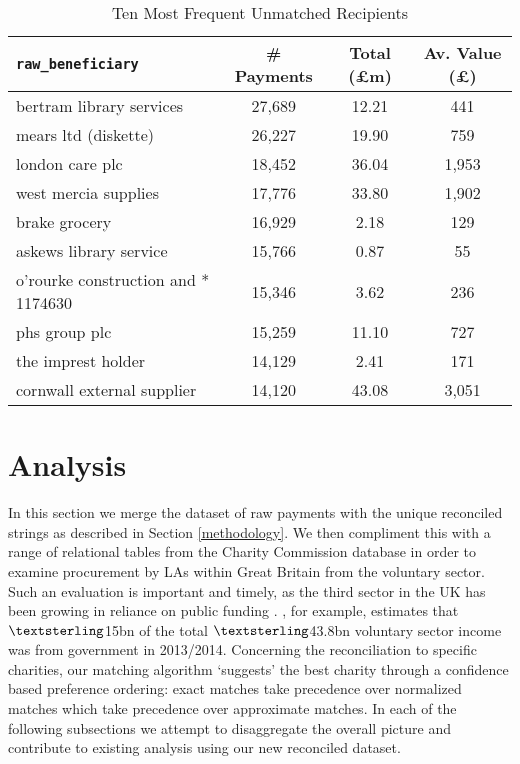 \documentclass[11pt]{article}
\begin{document}
\begin{table}[!t]
\centering
\caption{Ten Most Frequent Unmatched Recipients}
\begin{small}
\label{mostfrequentlyunmatched}
\begin{tabular}{lccc}
\toprule
\texttt{raw\_beneficiary}                                                                                   & \# Payments & Total (£m) & Av. Value (£) \\  \midrule
bertram library services            & 27,689              & 12.21    & 441             \\
mears ltd (diskette)                & 26,227              & 19.90    & 759             \\
london care plc                     & 18,452              & 36.04    & 1,953            \\
west mercia supplies                & 17,776              & 33.80    & 1,902            \\
brake grocery                       & 16,929              & 2.18     & 129             \\
askews library service              & 15,766              & 0.87    & 55              \\
o'rourke construction and * 1174630 & 15,346              & 3.62     & 236             \\
phs group plc                       & 15,259              & 11.10    & 727             \\
the imprest holder                  & 14,129              & 2.41     & 171             \\
cornwall external supplier          & 14,120              & 43.08    & 3,051           \\ \bottomrule
\end{tabular}
\end{small}
\end{table}

\section{Analysis}\label{analysis}

In this section we merge the dataset of raw payments with the unique reconciled strings as described in Section \ref{methodology}. We then compliment this with a range of relational tables from the Charity Commission database in order to examine procurement by LAs within Great Britain from the voluntary sector. Such an evaluation is important and timely, as the third sector in the UK has been growing in reliance on public funding \citep{cliffordfreidamohan2010}. \cite{ncvo2016}, for example, estimates that $\textsterling$15bn of the total $\textsterling$43.8bn voluntary sector income was from government in 2013/2014. Concerning the reconciliation to specific charities, our matching algorithm `suggests' the best charity through a confidence based preference ordering: exact matches take precedence over normalized matches which take precedence over approximate matches. In each of the following subsections we attempt to disaggregate the overall picture and contribute to existing analysis using our new reconciled dataset.
\end{document}
